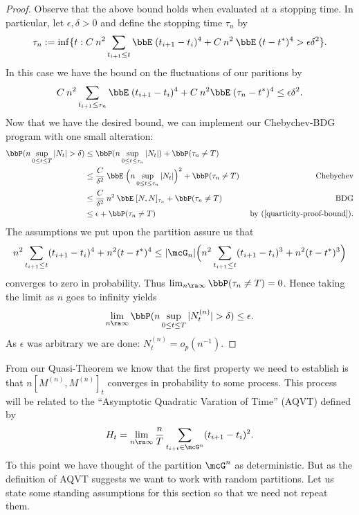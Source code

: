 \documentclass{report}
\begin{document}
\begin{proof}
Observe that the above bound holds when evaluated at a stopping time. 
In particular, let $\epsilon, \delta > 0$ and define the stopping time
$\tau_n$ by
\[
\tau_n := \inf \{ t :  C \: n^2 \sum_{t_{i+1} \leq t} \bbE \; (
t_{i+1} - t_i)^4 + C \: n^2 \: \bbE \; ( t - t^*)^4 > \epsilon
\delta^2 \}.
\]
In this case we have the bound on the fluctuations of our paritions by
\begin{equation}
\label{quarticity-proof-bound}
C \: n^2 \sum_{t_{i+1} \leq \tau_n} \bbE \; ( t_{i+1} - t_i)^4 + C \:
n^2 \bbE \; ( \tau_n - t^*)^4 \leq \epsilon \delta^2.
\end{equation}
Now that we have the desired bound, we can implement our Chebychev-BDG
program with one small alteration:
\begin{align*}
\bbP( n \sup_{0 \leq t \leq T} |N_t| > \delta) 
& \leq \bbP(n \sup_{0 \leq t \leq \tau_n} |N_t|) + \bbP(\tau_n \neq T)
&  \\
& \leq \frac{C}{\delta^2} \: \bbE \; \Big( n \sup_{0 \leq t \leq
\tau_n} |N_t| \Big)^2 + \bbP(\tau_n \neq T) & \textmd{Chebychev} \\
& \leq \frac{C}{\delta^2} \: n^2 \: \bbE \; [N,N]_{\tau_n} +
\bbP(\tau_n \neq T) & \textmd{BDG} \\
& \leq \epsilon + \bbP(\tau_n \neq T) & \textmd{ by
(\ref{quarticity-proof-bound}).}
\end{align*}
The assumptions we put upon the partition assure us that
\[
n^2 \sum_{t_{i+1} \leq t}( t_{i+1} - t_i)^4 +  n^2 ( t - t^*)^4 \leq
|\mcG_n| \Big(n^2 \sum_{t_{i+1} \leq t}( t_{i+1} - t_i)^3 +  n^2 ( t -
t^*)^3 \Big)
\]
converges to zero in probability.  Thus $\lim_{n \ra \infty}
\bbP(\tau_n \neq T) = 0$.  Hence taking the limit as $n$ goes to
infinity yields
\[
\lim_{n \ra \infty} \bbP ( n \sup_{0 \leq t \leq T} |N^{(n)}_t| >
\delta) \leq \epsilon.
\]
As $\epsilon$ was arbitrary we are done: $N^{(n)}_t = o_p(n^{-1})$.

\end{proof}


From our Quasi-Theorem we know that the first property we need to
establish is that $n [M^{(n)},M^{(n)}]_t $ converges in probability to
some process.  This process will be related to the ``Asymptotic
Quadratic Varation of Time'' (AQVT) defined by
\[
H_t = \lim_{n \ra \infty} \frac{n}{T} \sum_{t_{i+t} \in \mcG^n}
(t_{i+1} - t_i)^2.
\]
To this point we have thought of the partition $\mcG^n$ as
deterministic.  But as the definition of AQVT suggests we want to work
with random partitions.  Let us state some standing assumptions for
this section so that we need not repeat them.
\end{document}
